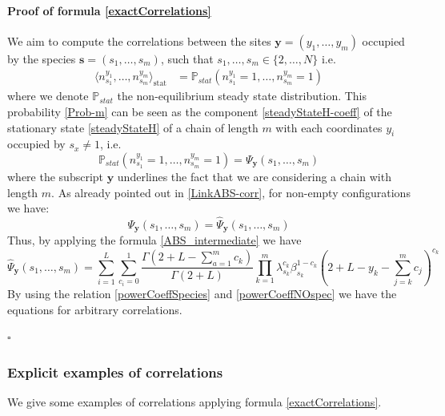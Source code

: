 \documentclass[11pt]{article}
\numberwithin{equation}{section}
\numberwithin{equation}{subsection}
\begin{document}
 \paragraph{Proof of formula \eqref{exactCorrelations}}
 We aim to compute the correlations between the sites $\mathbf{y}=\left(y_{1},\ldots,y_{m}\right)$ occupied by the species $\mathbf{s}=\left(s_{1},\ldots,s_{m}\right)$, such that $s_{1},\ldots,s_{m}\in \{2,\ldots,N\}$ i.e. 
\begin{equation}\label{Prob-m}
	\begin{split}
		\langle n_{s_{1}}^{y_{1}},\ldots, n_{s_{m}}^{y_{m}}\rangle_{\text{stat}}&
		=\mathbb{P}_{stat}\left(n_{s_{1}}^{y_{1}}=1,\ldots,n_{s_{m}}^{y_{m}}=1\right)
	\end{split}
\end{equation}
where we denote $\mathbb{P}_{stat}$ the non-equilibrium steady state distribution. 
This probability \eqref{Prob-m} can be seen as the component \eqref{steadyStateH-coeff} of the stationary state \eqref{steadyStateH} of a chain of length $m$ with each coordinates $y_{i}$ occupied by $s_{x}\neq 1$, i.e. 
\begin{equation}
	\mathbb{P}_{stat}\left(n_{s_{1}}^{y_{1}}=1,\ldots,n_{s_{m}}^{y_{m}}=1\right)=\Psi_{\bm{y}}\left(s_{1},\ldots,s_{m}\right)
\end{equation}
where the subscript $\bm{y}$ underlines the fact that we are considering a chain with length $m$. 
As already pointed out in \eqref{LinkABS-corr}, for non-empty configurations we have:
\begin{equation}\label{Corr-mABS}
	\Psi_{\bm{y}}(s_{1},\ldots,s_{m})=\widehat{\Psi}_{\bm{y}}(s_{1},\ldots,s_{m})
\end{equation}
Thus, by applying the formula \eqref{ABS_intermediate} we have 
\begin{equation}
	\widehat{\Psi}_{\bm{y}}(s_{1},\ldots,s_{m})=\sum_{i=1}^{L}\sum_{c_{i}=0}^{1}\frac{\Gamma(2+L-\sum_{a=1}^{m}c_{k})}{\Gamma(2+L)}\prod_{k=1}^{m}\lambda_{s_{k}}^{c_{k}}\beta_{s_{k}}^{1-c_{k}}\left(2+L-y_{k}-\sum_{j=k}^{m}c_{j}\right)^{c_{k}}
\end{equation}
By using the relation \eqref{powerCoeffSpecies} and \eqref{powerCoeffNOspec} we have the equations for arbitrary correlations.
\begin{flushright}
    $\square$
\end{flushright}
\subsubsection{Explicit examples of correlations}
We give some examples of correlations applying formula \eqref{exactCorrelations}.
\end{document}
